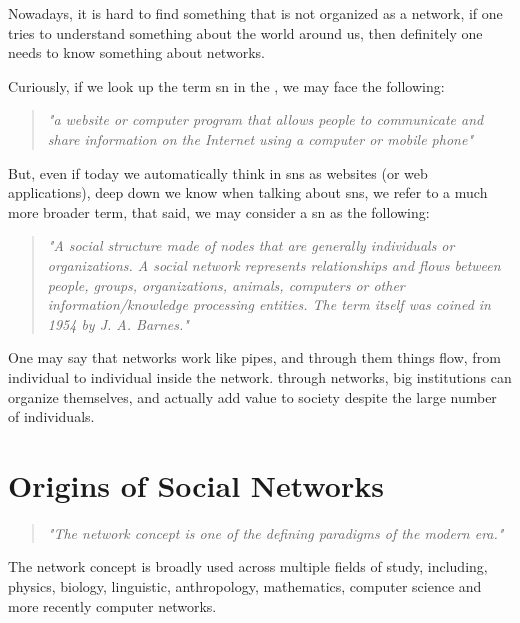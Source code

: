 
Nowadays, it is hard to find something that is not organized as a network, if one tries to understand something about the world around us, then definitely one needs to know something about networks.

Curiously, if we look up the term \gls{sn} in the \cite{dictionary2002cambridge}, we may face the following:

\begin{quote}
\textit{"a website or computer program that allows people to communicate and share information on the Internet using a computer or mobile phone"}
\end{quote}

But, even if today we automatically think in \glspl{sn} as websites (or web applications), deep down we know when talking about \glspl{sn}, we refer to a much more broader term, that said, we may consider a \gls{sn} as the following:

\begin{quote}
\textit{"A social structure made of nodes that are generally individuals or organizations. A social network represents relationships and flows between people, groups, organizations, animals, computers or other information/knowledge processing entities. The term itself was coined in 1954 by J. A. Barnes."}
\cite{webopediasn}
\end{quote}

One may say that networks work like pipes, and through them things flow, from individual to individual inside the network. through networks, big institutions can organize themselves, and actually add value to society despite the large number of individuals.


\section{Origins of Social Networks}

\begin{quote}
\textit{"The network concept is one of the defining paradigms of the modern era."}
\cite{kilduff2003social}
\end{quote}

The network concept is broadly used across multiple fields of study, including, physics, biology, linguistic, anthropology, mathematics, computer science and more recently computer networks.\\

